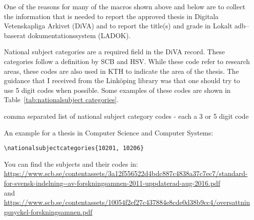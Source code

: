 \documentclass[examplethesis.tex]{subfiles}
\begin{document}
One of the reasons for many of the macros shown above and below are to collect the information that is needed to report the approved thesis in Digitala Vetenskapliga Arkivet (DiVA) and to report the title(s) and grade in Lokalt adb–baserat dokumentationssystem (LADOK).

National subject categories are a required field in the DiVA record. These categories follow a definition by SCB and HSV.
While these code refer to research areas, these codes are also used in KTH to indicate the area of the thesis. The guidance that I received from the Linköping library was that one should try to use 5 digit codes when possible. Some examples of these codes are shown in Table~\ref{tab:nationalsubject categories}.
\begin{description}[leftmargin=!, labelwidth =\widthof{\texttt{\textbackslash nationalsubjectcategories\{\}}}]
\item [\texttt{\textbackslash nationalsubjectcategories\{\}}] comma separated list of national subject category codes - each a 3 or 5 digit code
\end{description}

An example for a thesis in Computer Science and Computer Systems:
\begin{lstlisting}[style=latexExampleForAuthors]
\nationalsubjectcategories{10201, 10206}
\end{lstlisting}

You can find the subjects and their codes in:\\ \url{https://www.scb.se/contentassets/3a12f556522d4bdc887c4838a37c7ec7/standard-for-svensk-indelning--av-forskningsamnen-2011-uppdaterad-aug-2016.pdf}\\
and\\
\url{https://www.scb.se/contentassets/10054f2ef27c437884e8cde0d38b9cc4/oversattningsnyckel-forskningsamnen.pdf}
\end{document}
